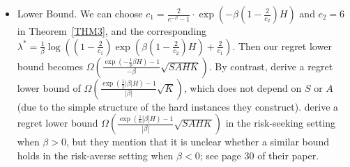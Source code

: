 \documentclass[11pt]{article}
\newcommand{\1}{\mathbbm{1}}
\begin{document}
\begin{itemize}
\item Lower Bound. We can choose $c_1=\frac{2}{e^{-\beta}-1}\cdot \exp\left(-\beta \left(1-\frac{2}{c_2}\right)H\right)$ and $c_2=6$ in Theorem~\ref{THM3}, and  
the corresponding $\lambda^*=\frac{1}{\beta}\log\left(\left(1-\frac{2}{c_1}\right)\exp\left(\beta\left(1-\frac{2}{c_2}\right)H\right)+\frac{2}{c_1}\right)$. Then our regret lower bound becomes $\Omega\left(\frac{\exp\left(-\frac{1}{3}\beta H\right)-1}{-\beta}\sqrt{SAHK}\right)$. By contrast, \cite{fei2020risk} derive a regret lower bound of $\Omega\left(\frac{\exp(\frac{1}{2}\vert\beta\vert H)-1}{\vert\beta\vert}\sqrt{K}\right)$, which does not depend on $S$ or $A$ (due to the simple structure of the hard instances they construct). \cite{liang2022bridging} derive a regret lower bound $\Omega\left(\frac{\exp(\frac{1}{6} |\beta| H)-1}{|\beta|}\sqrt{SAHK}\right)$ in the risk-seeking setting when $\beta>0$, but they mention that it is unclear whether a similar bound holds in the risk-averse setting when $\beta<0$; see page 30 of their paper.



\end{itemize}




\end{document}
